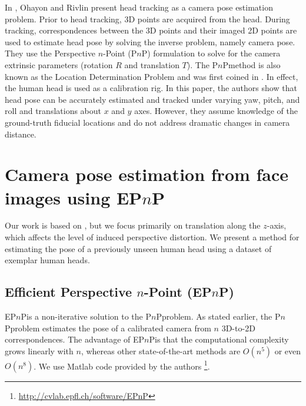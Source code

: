 \documentclass[runningheads]{llncs}
\newcommand {\PnP} {P$n$P}
\newcommand {\EPnP} {EP$n$P}
\begin{document}
In \cite{ohayon2006robust}, Ohayon and Rivlin present head tracking as a camera pose estimation problem.  
Prior to head tracking, 3D points are acquired from the head.  
During tracking, correspondences between the 3D points and their imaged 2D points are used to estimate head pose by solving the inverse problem, namely camera pose. 
They use the Perspective $n$-Point (\PnP) formulation to solve for the camera extrinsic parameters (rotation $R$ and translation $T$).  
The \PnP method is also known as the Location Determination Problem and was first coined in \cite{ransac}.  
In effect, the human head is used as a calibration rig.  
In this paper, the authors show that head pose can be accurately estimated and tracked under varying yaw, pitch, and roll and translations about $x$ and $y$ axes. 
However, they assume knowledge of the ground-truth fiducial locations and do not address dramatic changes in camera distance.

\section{Camera pose estimation from face images using \EPnP}

Our work is based on \cite{ohayon2006robust}, but we focus primarily on translation along the $z$-axis, which affects the level of induced perspective distortion.  
We present a method for estimating the pose of a previously unseen human head using a dataset of exemplar human heads. 

\subsection{Efficient Perspective $n$-Point (\EPnP)}
\EPnP is a non-iterative solution to the \PnP problem.  
As stated earlier, the \PnP problem estimates the pose of a calibrated camera from $n$ 3D-to-2D correspondences.  
The advantage of \EPnP is that the computational complexity grows linearly with $n$, whereas other state-of-the-art methods are $O(n^5)$ or even $O(n^8)$.  
We use Matlab code provided by the authors \footnote{\url{http://cvlab.epfl.ch/software/EPnP}}.
\end{document}
